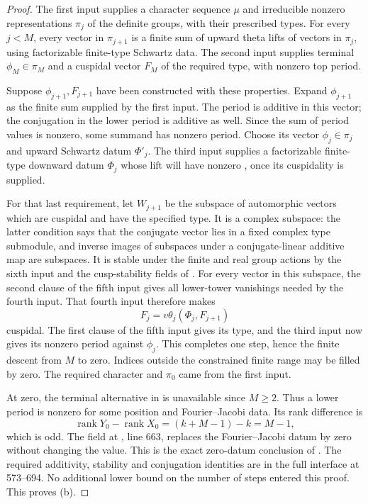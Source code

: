 \begin{proof}
The first input supplies a character sequence $\mu$ and irreducible nonzero
representations $\pi_j$ of the definite groups, with their prescribed types.
For every $j<M$, every vector in $\pi_{j+1}$ is a finite sum of upward theta
lifts of vectors in $\pi_j$, using factorizable finite-type Schwartz data.
The second input supplies terminal $\phi_M\in\pi_M$ and a cuspidal vector
$F_M$ of the required type, with nonzero top period.

Suppose $\phi_{j+1},F_{j+1}$ have been constructed with these properties.
Expand $\phi_{j+1}$ as the finite sum supplied by the first input.
The period is additive in this vector; the conjugation in the lower
period is additive as well. Since the sum of period values is nonzero,
some summand has nonzero period. Choose its vector $\phi_j\in\pi_j$ and
upward Schwartz datum $\Phi'_j$.
The third input supplies a factorizable finite-type downward datum $\Phi_j$
whose lift will have nonzero , once its cuspidality is supplied.

For that last requirement, let $W_{j+1}$ be the subspace of automorphic
vectors which are cuspidal and have the specified  type.
It is a complex subspace: the latter condition says that the conjugate
vector lies in a fixed complex type submodule, and inverse images of
subspaces under a conjugate-linear additive map are subspaces.
It is stable under the finite and real group actions by the sixth input
and the cusp-stability fields of .
For every vector in this subspace, the second clause of the fifth input
gives all lower-tower vanishings needed by the fourth input.
That fourth input therefore makes
\[
 F_j=v\theta_j(\Phi_j,F_{j+1})
\]
cuspidal. The first clause of the fifth input gives its  type,
and the third input now gives its nonzero period against $\phi_j$.
This completes one step, hence the finite descent from $M$ to zero.
Indices outside the constrained finite range may be filled by zero.
The required character and $\pi_0$ came from the first input.

At zero, the terminal alternative in  is unavailable since
$M\ge2$. Thus a lower period is nonzero for some position and
Fourier--Jacobi data. Its rank difference is
\[
 \operatorname{rank}Y_0-\operatorname{rank}X_0
       =(k+M-1)-k=M-1,
\]
which is odd. The field  at
, line 663, replaces the Fourier--Jacobi datum by zero
without changing the value. This is the exact zero-datum conclusion of
. The required additivity, stability and conjugation
identities are in the full  interface at 573--694.
No additional lower bound on the number of steps entered this proof.
This proves (b).


\end{proof}
